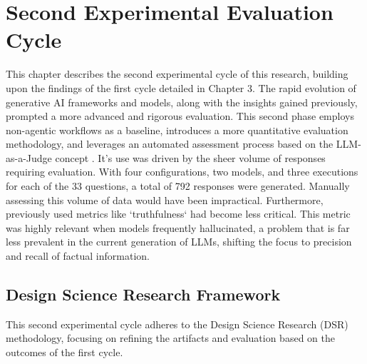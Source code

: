 

\chapter{Second Experimental Evaluation Cycle}
\label{chap:second_experiment}

This chapter describes the second experimental cycle of this research, building upon the findings of the first cycle detailed in Chapter 3. The rapid evolution of generative AI frameworks and models, along with the insights gained previously, prompted a more advanced and rigorous evaluation. This second phase employs non-agentic workflows as a baseline, introduces a more quantitative evaluation methodology, and leverages an automated assessment process based on the LLM-as-a-Judge concept \citep{Gu2025}. It's use was driven by the sheer volume of responses requiring evaluation. With four configurations, two models, and three executions for each of the 33 questions, a total of 792 responses were generated. Manually assessing this volume of data would have been impractical. Furthermore, previously used metrics like `truthfulness` had become less critical. This metric was highly relevant when models frequently hallucinated, a problem that is far less prevalent in the current generation of LLMs, shifting the focus to precision and recall of factual information.


\section{Design Science Research Framework}

    This second experimental cycle adheres to the Design Science Research (DSR) methodology, focusing on refining the artifacts and evaluation based on the outcomes of the first cycle.

